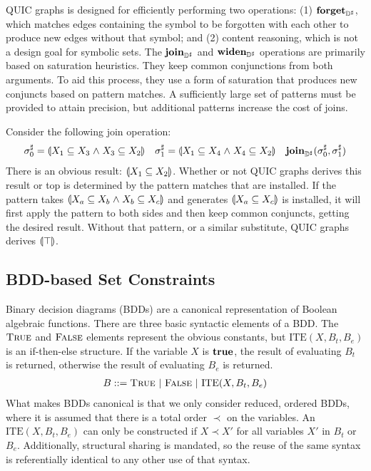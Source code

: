 QUIC graphs is designed for efficiently performing two operations:
(1) $\textbf{forget}_{{\mathbb{D}}^{\sharp}}$, which matches edges containing the symbol to be
forgotten with each other to produce new edges without that symbol; and
(2) content reasoning, which is not a design goal for symbolic sets.
The $\textbf{join}_{{\mathbb{D}}^{\sharp}}$ and $\textbf{widen}_{{\mathbb{D}}^{\sharp}}$ operations are primarily based on
saturation heuristics.
They keep common conjunctions from both arguments.
To aid this process, they use a form of saturation that produces new
conjuncts based on pattern matches.
A sufficiently large set of patterns must be provided to attain precision,
but additional patterns increase the cost of joins.
\begin{example} \label{ex:Qjoin}  Consider the following join operation:
    \begin{align*}
      {\sigma}^{\sharp}_0 &= \llparenthesis X_1 \subseteq X_3 \mathrel{\wedge} X_3 \subseteq X_2 \rrparenthesis &
      {\sigma}^{\sharp}_1 &= \llparenthesis X_1 \subseteq X_4 \mathrel{\wedge} X_4 \subseteq X_2 \rrparenthesis &
      \textbf{join}_{{\mathbb{D}}^{\sharp}}({\sigma}^{\sharp}_0, {\sigma}^{\sharp}_1 )
    \end{align*}
    There is an obvious result: $\llparenthesis X_1 \subseteq X_2 \rrparenthesis$.  Whether or not QUIC graphs derives this result or top is determined by the pattern matches that are installed.  If the pattern takes $\llparenthesis X_a \subseteq X_b \mathrel{\wedge} X_b \subseteq X_c \rrparenthesis$ and generates $\llparenthesis X_a \subseteq X_c \rrparenthesis$ is installed, it will first apply the pattern to both sides and then keep common conjuncts, getting the desired result.  Without that pattern, or a similar substitute, QUIC graphs derives $\llparenthesis \top \rrparenthesis$.
\end{example}

\subsection{BDD-based Set Constraints}
\label{s:4:3:bdd}
Binary decision diagrams (BDDs) are a canonical representation of Boolean algebraic functions.  There are three basic syntactic elements of a BDD.  The $\textsc{True}$ and $\textsc{False}$ elements represent the obvious constants, but $\textrm{ITE}(X,B_t,B_e)$ is an if-then-else structure.  If the variable $X$ is $\mathbf{true}$, the result of evaluating $B_t$ is returned, otherwise the result of evaluating $B_e$ is returned.
\begin{align*}
  B ::= \textsc{True} \ | \ \textsc{False} \ | \ \textrm{ITE}(X,B_t,B_e)
\end{align*}
What makes BDDs canonical is that we only consider reduced, ordered BDDs, where it is assumed that there is a total order $\prec$ on the variables.  An $\textrm{ITE}(X,B_t,B_e)$ can only be constructed if $X \prec X'$ for all variables $X'$ in $B_t$ or $B_e$.  Additionally, structural sharing is mandated, so the reuse of the same syntax is referentially identical to any other use of that syntax.

